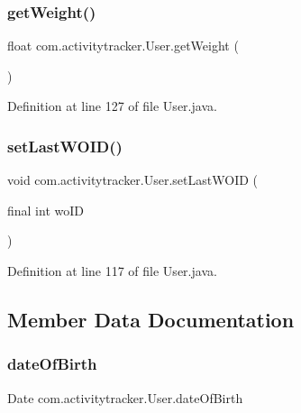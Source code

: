 \subsubsection{\texorpdfstring{get\+Weight()}{getWeight()}}
{\footnotesize\ttfamily float com.\+activitytracker.\+User.\+get\+Weight (\begin{DoxyParamCaption}{ }\end{DoxyParamCaption})}



Definition at line 127 of file User.\+java.

\mbox{\label{classcom_1_1activitytracker_1_1_user_aae20422e5870c5ba771fb15a5cc6414f}} 
\subsubsection{\texorpdfstring{set\+Last\+W\+O\+I\+D()}{setLastWOID()}}
{\footnotesize\ttfamily void com.\+activitytracker.\+User.\+set\+Last\+W\+O\+ID (\begin{DoxyParamCaption}\item[{final int}]{wo\+ID }\end{DoxyParamCaption})}



Definition at line 117 of file User.\+java.



\subsection{Member Data Documentation}
\mbox{\label{classcom_1_1activitytracker_1_1_user_a40b0d4ce16246066c0e948edef864d94}} 
\subsubsection{\texorpdfstring{date\+Of\+Birth}{dateOfBirth}}
{\footnotesize\ttfamily Date com.\+activitytracker.\+User.\+date\+Of\+Birth\hspace{0.3cm}{\ttfamily [private]}}



